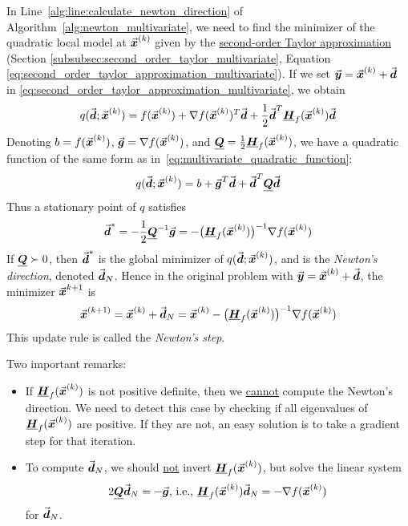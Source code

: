 In Line~\ref{alg:line:calculate_newton_direction} of Algorithm~\ref{alg:newton_multivariate}, we need to find the minimizer of the quadratic local model at \(\vec{\boldsymbol{x}}^{(k)}\) given by the \hyperref[eq:second_order_taylor_approximation_multivariate]{second-order Taylor approximation} (Section \ref{subsubsec:second_order_taylor_multivariate}, Equation \ref{eq:second_order_taylor_approximation_multivariate}).
If we set \(\vec{\boldsymbol{y}} = \vec{\boldsymbol{x}}^{(k)} + \vec{\boldsymbol{d}}\) in \eqref{eq:second_order_taylor_approximation_multivariate}, we obtain
\[
q(\vect{d};\vect{x}^{(k)}) = f(\vect{x}^{(k)}) + \nabla f(\vect{x}^{(k)})^{T}\vect{d} + \frac{1}{2}\vect{d}^{T}\matr{H}_{f}(\vect{x}^{(k)})\vect{d} %
\]
Denoting \(b = f(\vec{\boldsymbol{x}}^{(k)})\), \(\vec{\boldsymbol{g}} = \nabla f(\vec{\boldsymbol{x}}^{(k)})\), and \(\underline{\boldsymbol{Q}} = \frac{1}{2}\underline{\boldsymbol{H}}_{f}(\vec{\boldsymbol{x}}^{(k)})\), we have a quadratic function of the same form as in~\eqref{eq:multivariate_quadratic_function}:
\[
q(\vect{d};\vect{x}^{(k)}) = b + \vect{g}^{T}\vect{d} + \vect{d}^{T}\matr{Q}\vect{d} %
\]
Thus a stationary point of \(q\) satisfies
\[
\vect{d}^{*} = -\frac{1}{2}\matr{Q}^{-1}\vect{g} = -\big(\matr{H}_{f}(\vect{x}^{(k)})\big)^{-1} \nabla f(\vect{x}^{(k)}) %
\]
If \(\underline{\boldsymbol{Q}} \succ 0\), then \(\vec{\boldsymbol{d}}^{*}\) is the global minimizer of \(q(\vec{\boldsymbol{d}};\vec{\boldsymbol{x}}^{(k)})\), and is the \emph{Newton's direction}, denoted \(\vec{\boldsymbol{d}}_{N}\).
Hence in the original problem with \(\vec{\boldsymbol{y}} = \vec{\boldsymbol{x}}^{(k)} + \vec{\boldsymbol{d}}\), the minimizer \(\vec{\boldsymbol{x}}^{k+1}\) is
\[
\vect{x}^{(k+1)} = \vect{x}^{(k)} + \vect{d}_{N} = \vect{x}^{(k)} - \big(\matr{H}_{f}(\vect{x}^{(k)})\big)^{-1} \nabla f(\vect{x}^{(k)}) %
\]
This update rule is called the \emph{Newton's step}.
\begin{caution} Two important remarks:
\begin{itemize}
\item If \(\underline{\boldsymbol{H}}_{f}(\vec{\boldsymbol{x}}^{(k)})\) is not positive definite, then we \underline{cannot} compute the Newton's direction.
We need to detect this case by checking if all eigenvalues of \(\underline{\boldsymbol{H}}_{f}(\vec{\boldsymbol{x}}^{(k)})\) are positive.
If they are not, an easy solution is to take a gradient step for that iteration.
\item To compute \(\vec{\boldsymbol{d}}_{N}\), we should \underline{not} invert \(\underline{\boldsymbol{H}}_{f}(\vec{\boldsymbol{x}}^{(k)})\), but solve the linear system 
\[
2\underline{\boldsymbol{Q}}\vec{\boldsymbol{d}}_{N} = -\vec{\boldsymbol{g}} \text{, i.e., }\underline{\boldsymbol{H}}_{f}(\vec{\boldsymbol{x}}^{(k)})\vec{\boldsymbol{d}}_{N} = -\nabla f(\vec{\boldsymbol{x}}^{(k)})
\]
for \(\vec{\boldsymbol{d}}_{N}\).\qedhere
\end{itemize}
\end{caution}


